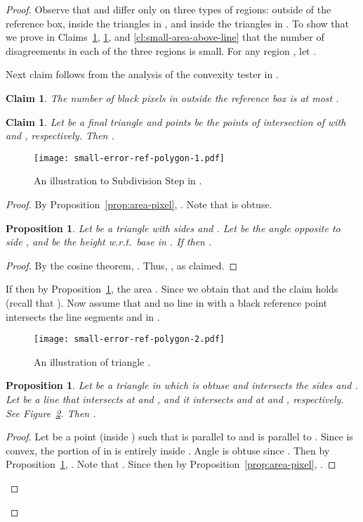 \documentclass[11pt,english]{article}
\newtheorem{proposition}[theorem]{Proposition}
\newtheorem{claim}[theorem]{Claim}
\numberwithin{figure}{section}
\newcommand{\mch}[1]{{\color{black}#1}}
\begin{document}
\begin{proof}
Observe that  and  differ only on three types of regions: outside of the reference box, inside the triangles in , and inside the triangles in . To show that  we prove in Claims~\ref{cl:error-in-strips}, \ref{cl:error-in-triangles}, and \ref{cl:small-area-above-line} that the number of disagreements in each of the three regions is small.
For any region , let .


Next claim
follows from the analysis of the convexity tester in \cite{Ras03}.
\begin{claim}
\label{cl:error-in-strips}
The number of black pixels in 
outside the reference box is at most .
\end{claim}
\mch{

\begin{claim}\label{cl:error-in-triangles}
Let  be a final triangle and points  be the points of intersection of  with  and , respectively. Then .
\end{claim}


\begin{figure}[ht]
\centering
\texttt{[image: small-error-ref-polygon-1.pdf]}
\caption{ An illustration to Subdivision Step in .}
\label{fig:small-error-ref-poly-1}
\end{figure}


\begin{proof}
By Proposition~\ref{prop:area-pixel}, . Note that  is obtuse.
\begin{proposition}
\label{prop:obtuse-height}
Let  be a triangle with sides  and . Let  be the angle opposite to side , and  be the height w.r.t.\ base  in . If  then .
\end{proposition}
\begin{proof}
By the cosine theorem, . Thus, , as claimed.
\end{proof}
If  then by Proposition~\ref{prop:obtuse-height}, the area . Since  we obtain that  and the claim holds (recall that ). Now assume that  and no line in  with a black reference point intersects the line segments  and  in .



\begin{figure}
\centering
\texttt{[image: small-error-ref-polygon-2.pdf]}
\caption{ An illustration of triangle .}
\label{fig:small-error-ref-poly-2}
\end{figure}

\begin{proposition}
\label{prop:small-error-above}
Let  be a triangle in which  is obtuse and  intersects the sides  and . Let  be a line that intersects  at  and , and it intersects  and  at  and , respectively. See Figure~\ref{fig:small-error-ref-poly-2}. Then .
\end{proposition}
\begin{proof}
Let  be a point (inside ) such that  is parallel to  and  is parallel to . Since  is convex, the portion of  in  is entirely inside . Angle  is obtuse since . Then by Proposition~\ref{prop:obtuse-height}, . Note that . Since  then by Proposition~\ref{prop:area-pixel}, .
\end{proof}


\end{proof}}
\end{proof}
\end{document}
